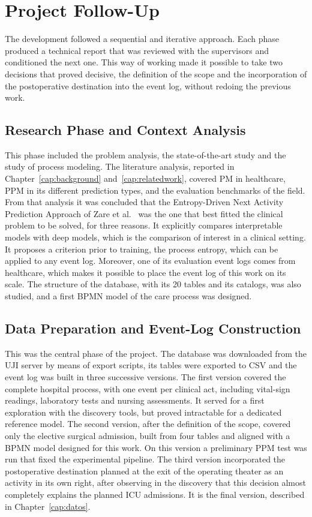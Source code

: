 \section{Project Follow-Up}
\label{sec:seguimiento}

The development followed a sequential and iterative approach. Each phase produced a technical report that was reviewed with the supervisors and conditioned the next one. This way of working made it possible to take two decisions that proved decisive, the definition of the scope and the incorporation of the postoperative destination into the event log, without redoing the previous work.

\subsection{Research Phase and Context Analysis}

This phase included the problem analysis, the state-of-the-art study and the study of process modeling. The literature analysis, reported in Chapter~\ref{cap:background} and~\ref{cap:relatedwork}, covered PM in healthcare, PPM in its different prediction types, and the evaluation benchmarks of the field. From that analysis it was concluded that the Entropy-Driven Next Activity Prediction Approach of Zare et al.\ \cite{zare2025} was the one that best fitted the clinical problem to be solved, for three reasons. It explicitly compares interpretable models with deep models, which is the comparison of interest in a clinical setting. It proposes a criterion prior to training, the process entropy, which can be applied to any event log. Moreover, one of its evaluation event logs comes from healthcare, which makes it possible to place the event log of this work on its scale. The structure of the  database, with its 20 tables and its catalogs, was also studied, and a first BPMN model of the care process was designed.

\subsection{Data Preparation and Event-Log Construction}

This was the central phase of the project. The database was downloaded from the UJI server by means of export scripts, its tables were exported to CSV and the event log was built in three successive versions. The first version covered the complete hospital process, with one event per clinical act, including vital-sign readings, laboratory tests and nursing assessments. It served for a first exploration with the discovery tools, but proved intractable for a dedicated reference model. The second version, after the definition of the scope, covered only the elective surgical admission, built from four tables and aligned with a BPMN model designed for this work. On this version a preliminary PPM test was run that fixed the experimental pipeline. The third version incorporated the postoperative destination planned at the exit of the operating theater as an activity in its own right, after observing in the discovery that this decision almost completely explains the planned ICU admissions. It is the final version, described in Chapter~\ref{cap:datos}.

